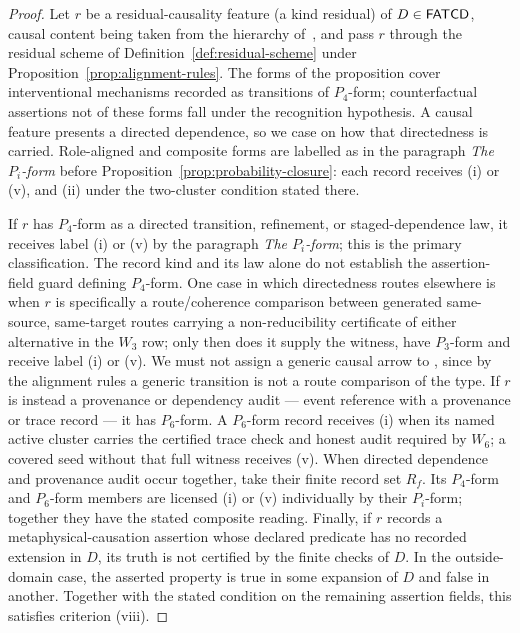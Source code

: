 \begin{proof}
Let \(r\) be a residual-causality feature (a kind residual) of
\(D \in \mathsf{FATCD}{}\), causal content being taken from the hierarchy of~\citet{Pearl2009}, and pass
\(r\) through the residual scheme of Definition~\ref{def:residual-scheme} under
Proposition~\ref{prop:alignment-rules}. The forms of the proposition cover
interventional mechanisms recorded as transitions of \(P_4\)-form; counterfactual assertions
not of these forms fall under the recognition hypothesis. A causal feature presents a
directed dependence, so we case on how that directedness is carried.
Role-aligned and composite forms are labelled as in the paragraph
\emph{The \(P_i\)-form} before Proposition~\ref{prop:probability-closure}: each
record receives (i) or (v), and (ii) under the two-cluster condition stated
there.

If \(r\) has \(P_4\)-form as a directed transition, refinement, or
staged-dependence law, it receives label (i) or (v) by the paragraph
\emph{The \(P_i\)-form}; this is the primary classification. The record
kind and its law alone do not establish the assertion-field guard
defining \(P_4\)-form. One case in which directedness routes elsewhere is when \(r\) is
specifically a route/coherence comparison between generated
same-source, same-target routes carrying a non-reducibility certificate of
either alternative in the \(W_3\) row; only then does it supply the \Pthree{}
witness, have \(P_3\)-form and receive label (i) or (v). We must not assign a
generic causal arrow to \Pthree{}, since by the alignment rules a
generic transition is not a route comparison of the \Pthree{} type. If
\(r\) is instead a provenance or dependency audit --- event reference
with a provenance or trace record --- it has \(P_6\)-form. A \(P_6\)-form
record receives (i) when its named active cluster carries the certified trace
check and honest audit required by \(W_6\); a covered seed without that full
witness receives (v). When directed dependence and provenance audit occur together, take
their finite record set \(R_f\). Its \(P_4\)-form and \(P_6\)-form
members are licensed (i) or (v) individually by their \(P_i\)-form; together they have
the stated composite reading.
Finally, if \(r\) records a metaphysical-causation assertion whose declared
predicate has no recorded extension in \(D\), its truth is not certified by
the finite checks of \(D\). In the outside-domain case, the asserted property is true in some
expansion of \(D\) and false in another. Together with the stated
condition on the remaining assertion fields, this satisfies
criterion (viii).


\end{proof}

